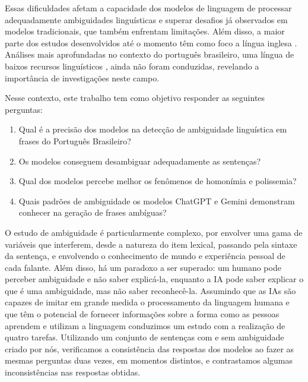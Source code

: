 Essas dificuldades afetam a capacidade dos modelos de linguagem de processar adequadamente ambiguidades linguísticas e superar desafios já observados em modelos tradicionais, que também enfrentam limitações. Além disso, a maior parte dos estudos desenvolvidos até o momento têm como foco a língua inglesa \cite{ortega2023linguistic}. Análises mais aprofundadas no contexto do português brasileiro, uma língua de baixos recursos linguísticos \cite{finger2021inteligencia, freitag2022sociolinguistic}, ainda não foram conduzidas, revelando a importância de investigações neste campo.

Nesse contexto, este trabalho tem como objetivo responder as seguintes perguntas:

\begin{enumerate}
    \item Qual é a precisão dos modelos na detecção de ambiguidade linguística em frases do Português Brasileiro?    
    \item Os modelos conseguem desambiguar adequadamente as sentenças?    
    \item Qual dos modelos percebe melhor os fenômenos de homonímia e polissemia?    
    \item Quais padrões de ambiguidade os modelos ChatGPT e Gemini demonstram conhecer na
    geração de frases ambíguas?
\end{enumerate}


O estudo de ambiguidade é particularmente complexo, por envolver uma gama de variáveis que interferem, desde a natureza do item lexical, passando pela sintaxe da sentença, e envolvendo o conhecimento de mundo e experiência pessoal de cada falante. Além disso,  há um paradoxo a ser superado: um humano pode perceber ambiguidade e não saber explicá-la, enquanto a IA pode saber explicar o que é uma ambiguidade, mas não saber reconhecê-la.  
Assumindo que as IAs são capazes de imitar em grande medida o processamento da linguagem humana e que têm o potencial de fornecer informações sobre a forma como as pessoas aprendem e utilizam a linguagem \cite{cai2023does} conduzimos um estudo com a realização de quatro tarefas. 
Utilizando um conjunto de sentenças com e sem ambiguidade criado por nós, verificamos a consistência das respostas dos modelos ao fazer as mesmas perguntas duas vezes, em momentos distintos, e contrastamos algumas inconsistências nas respostas obtidas. 